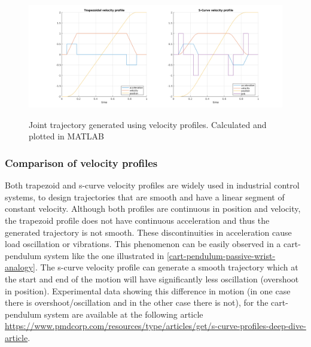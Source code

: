 \begin{center}
\begin{figure}[!htb]
\centering
\includegraphics[width=\textwidth]{images/vel-profiles.png}\\
\caption{Joint trajectory generated using velocity profiles. Calculated and plotted in MATLAB} 
\end{figure}
\end{center}


\subsubsection{Comparison of velocity profiles}

Both trapezoid and s-curve velocity profiles are widely used in industrial control systems, to design trajectories that are smooth and have a linear segment of constant velocity. Although both profiles are continuous in
position and velocity, the trapezoid profile does not have continuous acceleration and thus the generated trajectory is not smooth. These discontinuities in acceleration cause load oscillation or vibrations. This 
phenomenon can be easily observed in a cart-pendulum system like the one illustrated in \ref{cart-pendulum-passive-wrist-analogy}. The s-curve velocity profile can generate a smooth trajectory which at the start and end of 
the motion will have significantly less oscillation (overshoot in position). Experimental data showing this difference in motion (in one case there is overshoot/oscillation and in the other case there is not), for the cart-
pendulum system are available at the following article \url{https://www.pmdcorp.com/resources/type/articles/get/s-curve-profiles-deep-dive-article}.

